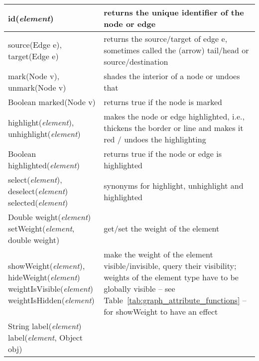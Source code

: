 \begin{table}
  \small
  \centering
  \begin{tabular}{| m{} | m{} |}
    \hline
    \textsf{id(\emph{element})}
    &
    returns the unique identifier of the node or edge
    \\ \hline
    \textsf{source(Edge e)}, \textsf{target(Edge e)}
    &
    returns the source/target of edge \textsf{e}, sometimes called the (arrow)
    tail/head or source/destination
    \\ \hline
    \textsf{mark(Node v), unmark(Node v)}
    &
    shades the interior of a node or undoes that
    \\ \hline
    \textsf{Boolean marked(Node v)}
    &
    returns \textsf{true} if the node is marked
    \\ \hline
    \textsf{highlight(\emph{element}), unhighlight(\emph{element})}
    &
    makes the node or edge highlighted, i.e.,
    thickens the border or line and makes it red / undoes the highlighting
    \\ \hline
    \textsf{Boolean highlighted(\emph{element})}
    &
    returns \textsf{true} if the node or edge is highlighted
    \\ \hline
    \shortstack[l]{
      \textsf{select(\emph{element})}, \textsf{deselect(\emph{element})}\\
      \textsf{selected(\emph{element})}
    }
    &
    synonyms for \textsf{highlight}, \textsf{unhighlight} and \textsf{highlighted}
    \\ \hline
    \shortstack[l]{
      \textsf{Double weight(\emph{element})}\\
      \textsf{setWeight(\emph{element}, double weight)}
    }
    &
    get/set the weight of the element
    \\ \hline
    \shortstack[l]{
      \textsf{showWeight(\emph{element})},
      \textsf{hideWeight(\emph{element})}\\
      \textsf{weightIsVisible(\emph{element})}\\
      \textsf{weightIsHidden(\emph{element})}
    }
    &
    make the weight of the element visible/invisible,
    query their visibility; weights of the element type
    have to be
    globally visible -- see Table~\ref{tab:graph_attribute_functions}
    -- for \textsf{showWeight} to have an effect
    \\ \hline
    \shortstack[l]{
      \textsf{String label(\emph{element})}\\
      \textsf{label(\emph{element}, Object obj)}
}
\end{tabular}
\end{table}
